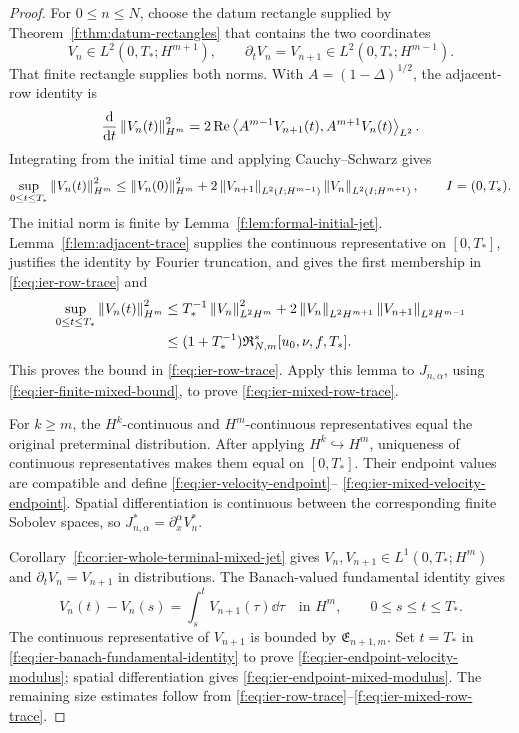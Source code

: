 \begin{proof}
For \(0\le n\le N\), choose the datum rectangle supplied by
Theorem~\ref{f:thm:datum-rectangles} that contains the two coordinates
\[
 V_n\in L^2(0,T_*;H^{m+1}),
 \qquad
 \partial_tV_n=V_{n+1}\in L^2(0,T_*;H^{m-1}).
\]
That finite rectangle supplies both norms.
With \(A=(1-\Delta)^{1/2}\), the adjacent-row identity is
\[
 \frac{\mathrm d}{\mathrm dt}\left\lVert V_n(t)\right\rVert_{H^m}^2
 =2\operatorname{Re}\left\langle A^{m-1}V_{n+1}(t),A^{m+1}V_n(t)\right\rangle_{L^2}.
\]
Integrating from the initial time and applying Cauchy--Schwarz gives
\begin{equation}
 \sup_{0\le t\le T_*}\left\lVert V_n(t)\right\rVert_{H^m}^2
 \le\left\lVert V_n(0)\right\rVert_{H^m}^2
 +2\left\lVert V_{n+1}\right\rVert_{L^2(I;H^{m-1})}
    \left\lVert V_n\right\rVert_{L^2(I;H^{m+1})},
 \qquad I=(0,T_*).
 \label{f:eq:ier-initial-row-trace-bound}
\end{equation}
The initial norm is finite by Lemma~\ref{f:lem:formal-initial-jet}.
Lemma~\ref{f:lem:adjacent-trace} supplies the continuous representative
on \([0,T_*]\), justifies the identity by Fourier truncation, and gives the
first membership in
\eqref{f:eq:ier-row-trace} and
\begin{align*}
 \sup_{0\le t\le T_*}\left\lVert V_n(t)\right\rVert_{H^m}^2
 &\le T_*^{-1}\left\lVert V_n\right\rVert_{L^2H^m}^2
 +2\left\lVert V_n\right\rVert_{L^2H^{m+1}}\left\lVert V_{n+1}\right\rVert_{L^2H^{m-1}}\\
 &\le(1+T_*^{-1})\mathfrak R_{N,m}^*[u_0,\nu,f,T_*].
\end{align*}
This proves the bound in \eqref{f:eq:ier-row-trace}.  Apply this lemma to
\(J_{n,\alpha}\), using \eqref{f:eq:ier-finite-mixed-bound}, to prove
\eqref{f:eq:ier-mixed-row-trace}.

For \(k\ge m\), the \(H^k\)-continuous and \(H^m\)-continuous
representatives equal the original preterminal distribution.  After applying
\(H^k\hookrightarrow H^m\), uniqueness of continuous representatives makes
them equal on \([0,T_*]\).  Their endpoint values are compatible and define
\eqref{f:eq:ier-velocity-endpoint}--%
\eqref{f:eq:ier-mixed-velocity-endpoint}.  Spatial differentiation is
continuous between the corresponding finite Sobolev spaces, so
\(J_{n,\alpha}^*=\partial_x^\alpha V_n^*\).

Corollary~\ref{f:cor:ier-whole-terminal-mixed-jet} gives
\(V_n,V_{n+1}\in L^1(0,T_*;H^m)\) and
\(\partial_tV_n=V_{n+1}\) in distributions.  The Banach-valued fundamental
identity gives
\begin{equation}
 V_n(t)-V_n(s)=\int_s^tV_{n+1}(\tau)\dd\tau
 \quad\text{in }H^m,
 \qquad0\le s\le t\le T_*.
 \label{f:eq:ier-banach-fundamental-identity}
\end{equation}
The continuous representative of \(V_{n+1}\) is bounded by
\(\mathfrak E_{n+1,m}\).  Set \(t=T_*\) in
\eqref{f:eq:ier-banach-fundamental-identity} to prove
\eqref{f:eq:ier-endpoint-velocity-modulus}; spatial differentiation gives
\eqref{f:eq:ier-endpoint-mixed-modulus}.  The remaining size estimates follow
from \eqref{f:eq:ier-row-trace}--\eqref{f:eq:ier-mixed-row-trace}.


\end{proof}
